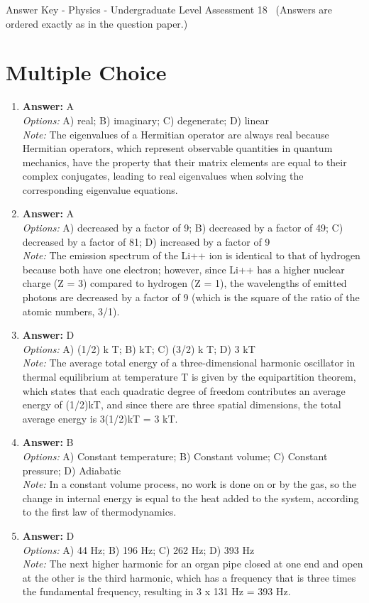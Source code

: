\documentclass[12pt]{article}
\begin{document}
\begin{center}
Answer Key - Physics - Undergraduate Level Assessment 18 \
\small (Answers are ordered exactly as in the question paper.)
\end{center}

\section*{Multiple Choice}
\begin{enumerate}[label=\arabic*.]
\item \textbf{Answer:} A
\\ \textit{Options:} A) real; B) imaginary; C) degenerate; D) linear
\\ \textit{Note:} The eigenvalues of a Hermitian operator are always real because Hermitian operators, which represent observable quantities in quantum mechanics, have the property that their matrix elements are equal to their complex conjugates, leading to real eigenvalues when solving the corresponding eigenvalue equations.
\item \textbf{Answer:} A
\\ \textit{Options:} A) decreased by a factor of 9; B) decreased by a factor of 49; C) decreased by a factor of 81; D) increased by a factor of 9
\\ \textit{Note:} The emission spectrum of the Li++ ion is identical to that of hydrogen because both have one electron; however, since Li++ has a higher nuclear charge (Z = 3) compared to hydrogen (Z = 1), the wavelengths of emitted photons are decreased by a factor of 9 (which is the square of the ratio of the atomic numbers, 3/1).
\item \textbf{Answer:} D
\\ \textit{Options:} A) (1/2) k T; B) kT; C) (3/2) k T; D) 3 kT
\\ \textit{Note:} The average total energy of a three-dimensional harmonic oscillator in thermal equilibrium at temperature T is given by the equipartition theorem, which states that each quadratic degree of freedom contributes an average energy of (1/2)kT, and since there are three spatial dimensions, the total average energy is 3(1/2)kT = 3 kT.
\item \textbf{Answer:} B
\\ \textit{Options:} A) Constant temperature; B) Constant volume; C) Constant pressure; D) Adiabatic
\\ \textit{Note:} In a constant volume process, no work is done on or by the gas, so the change in internal energy is equal to the heat added to the system, according to the first law of thermodynamics.
\item \textbf{Answer:} D
\\ \textit{Options:} A) 44 Hz; B) 196 Hz; C) 262 Hz; D) 393 Hz
\\ \textit{Note:} The next higher harmonic for an organ pipe closed at one end and open at the other is the third harmonic, which has a frequency that is three times the fundamental frequency, resulting in 3 x 131 Hz = 393 Hz.
\end{enumerate}
\end{document}
